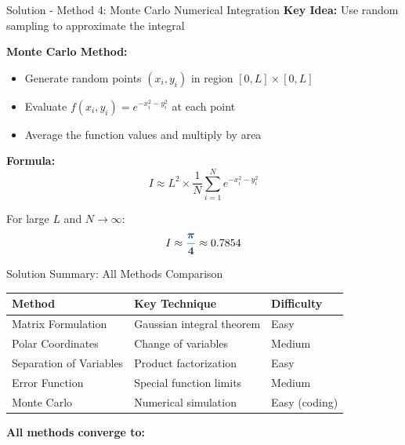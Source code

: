 \documentclass[12pt, aspectratio=169]{beamer}
\newcommand{\res}[1]{\textcolor{madblue}{\bm{#1}}}
\begin{document}
\begin{frame}{Solution - Method 4: Monte Carlo Numerical Integration}
\textbf{Key Idea:} Use random sampling to approximate the integral

\textbf{Monte Carlo Method:}
\begin{itemize}
    \item Generate random points $(x_i, y_i)$ in region $[0, L] \times [0, L]$
    \item Evaluate $f(x_i, y_i) = e^{-x_i^2 - y_i^2}$ at each point
    \item Average the function values and multiply by area
\end{itemize}

\textbf{Formula:}
\[
I \approx L^2 \times \frac{1}{N} \sum_{i=1}^N e^{-x_i^2 - y_i^2}
\]

For large $L$ and $N \to \infty$:
\[
I \approx \res{\frac{\pi}{4}} \approx 0.7854
\]
\end{frame}

\begin{frame}{Solution Summary: All Methods Comparison}
\begin{table}
\centering
\small
\begin{tabular}{|l|l|l|}
\hline
\textbf{Method} & \textbf{Key Technique} & \textbf{Difficulty} \\
\hline
Matrix Formulation & Gaussian integral theorem & Easy \\
\hline
Polar Coordinates & Change of variables & Medium \\
\hline
Separation of Variables & Product factorization & Easy \\
\hline
Error Function & Special function limits & Medium \\
\hline
Monte Carlo & Numerical simulation & Easy (coding) \\
\hline
\end{tabular}
\end{table}

\vspace{0.5cm}

\begin{center}
\textbf{All methods converge to: } \res{$\displaystyle \boxed{\frac{\pi}{4}}$}
\end{center}
\end{frame}

\end{document}
